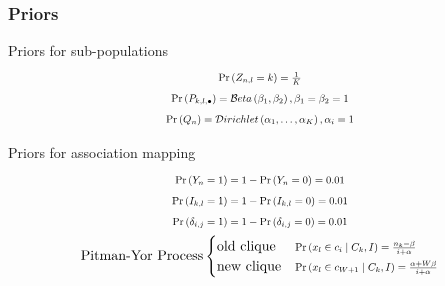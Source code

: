\documentclass[xcolor=dvipsnames, professionalfont]{beamer}
\begin{document}
\begin{frame}
\frametitle{Priors}
\begin{block}{Priors for sub-populations}
\begin{gather*}
\scalebox{0.75}{$\Prob{Z_{n,l} = k} = \frac{1}{K}$}												\\
\scalebox{0.75}{$\Prob{P_{k,l,\bullet}} = \BetaDist{\beta_1}{\beta_2}, \beta_1 = \beta_2 = 1$}	\\
\scalebox{0.75}{$\Prob{Q_n} = \Dir{\alpha_1, \dots, \alpha_K}, \alpha_i = 1$}
\end{gather*}
\end{block}
\begin{block}{Priors for association mapping}
\begin{gather*}
\scalebox{0.75}{$\Prob{Y_{n} = 1} = 1 - \Prob{Y_{n} = 0} = 0.01$}								\\
\scalebox{0.75}{$\Prob{I_{k,l} = 1} = 1 - \Prob{I_{k,l} = 0} = 0.01$}							\\
\scalebox{0.75}{$\Prob{\delta_{i,j} = 1} = 1 - \Prob{\delta_{i,j} = 0} = 0.01$}					\\
\text{Pitman-Yor Process} \begin{cases}
	\text{old clique} & \scalebox{0.75}{$\CProb{x_l \in c_i}{C_k,I} = \frac{n_k - \beta}{i + \alpha}$}					\\
	\text{new clique} & \scalebox{0.75}{$\CProb{x_l \in c_{W + 1}}{C_k,I} = \frac{\alpha + W \beta}{i + \alpha}$}
\end{cases}
\end{gather*}
\end{block}
\end{frame}



\end{document}
